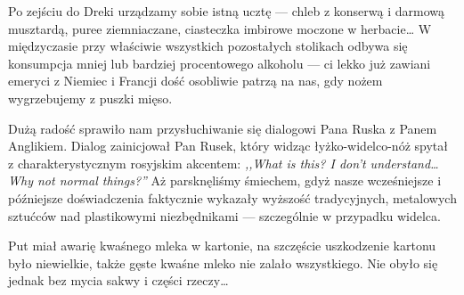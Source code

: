 
Po zejściu do Dreki urządzamy sobie istną ucztę --- chleb z konserwą i darmową musztardą, puree ziemniaczane, ciasteczka imbirowe moczone w herbacie… W międzyczasie przy właściwie wszystkich pozostałych stolikach odbywa się konsumpcja mniej lub bardziej procentowego alkoholu --- ci lekko już zawiani emeryci z Niemiec i Francji dość osobliwie patrzą na nas, gdy nożem wygrzebujemy z puszki mięso.

Dużą radość sprawiło nam przysłuchiwanie się dialogowi Pana Ruska z Panem Anglikiem. Dialog zainicjował Pan Rusek, który widząc łyżko-widelco-nóż spytał z charakterystycznym rosyjskim akcentem: \emph{,,What is this? I don’t understand… Why not normal things?''} Aż parsknęliśmy śmiechem, gdyż nasze wcześniejsze i późniejsze doświadczenia faktycznie wykazały wyższość tradycyjnych, metalowych sztućców nad plastikowymi niezbędnikami --- szczególnie w przypadku widelca.

Put miał awarię kwaśnego mleka w kartonie, na szczęście uszkodzenie kartonu było niewielkie, także gęste kwaśne mleko nie zalało wszystkiego. Nie obyło się jednak bez mycia sakwy i części rzeczy…



